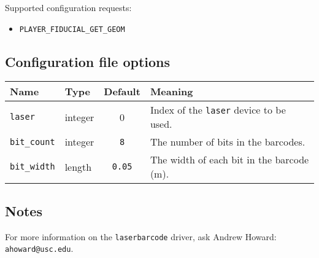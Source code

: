\noindent Supported configuration requests:
\begin{itemize}
\item \verb+PLAYER_FIDUCIAL_GET_GEOM+
\end{itemize}



\subsection*{Configuration file options}

\begin{center}
{\small \begin{tabularx}{\columnwidth}{|l|l|c|X|}
\hline
Name & Type & Default & Meaning\\
\hline
{\tt laser} & integer & 0 & Index of the {\tt laser} device to be used.\\
{\tt bit\_count} & integer & {\tt 8} & The number of bits in the barcodes.\\
{\tt bit\_width} & length & {\tt 0.05} & The width of each bit in the barcode
(m).\\
\hline
\end{tabularx}}
\end{center}

\subsection*{Notes}

For more information on the {\tt laserbarcode} driver, ask Andrew Howard:
{\tt ahoward@usc.edu}.
